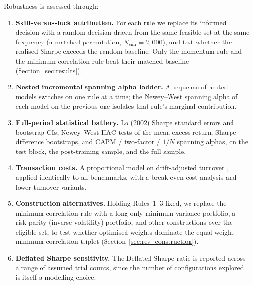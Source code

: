 Robustness is assessed through:
\begin{enumerate}[label=(\roman*)]
    \item \textbf{Skill-versus-luck attribution.} For each rule we replace its
          informed decision with a random decision drawn from the same feasible
          set at the same frequency (a matched permutation, $N_{\text{sim}} =
          2{,}000$), and test whether the realised Sharpe exceeds the random
          baseline. Only the momentum rule and the minimum-correlation rule beat
          their matched baseline (Section~\ref{sec:results}).
    \item \textbf{Nested incremental spanning-alpha ladder.} A sequence of nested
          models switches on one rule at a time; the Newey--West spanning alpha of
          each model on the previous one isolates that rule's marginal
          contribution.
    \item \textbf{Full-period statistical battery.} Lo (2002) Sharpe standard
          errors and bootstrap CIs, Newey--West HAC tests of the mean excess
          return, Sharpe-difference bootstraps, and CAPM / two-factor / $1/N$
          spanning alphas, on the test block, the post-training sample, and the
          full sample.
    \item \textbf{Transaction costs.} A proportional model on drift-adjusted
          turnover \citep{demiguel2009}, applied identically to all benchmarks,
          with a break-even cost analysis and lower-turnover variants.
    \item \textbf{Construction alternatives.} Holding Rules~1--3 fixed, we replace
          the minimum-correlation rule with a long-only minimum-variance portfolio,
          a risk-parity (inverse-volatility) portfolio, and other constructions over
          the eligible set, to test whether optimised weights dominate the
          equal-weight minimum-correlation triplet (Section~\ref{sec:res_construction}).
    \item \textbf{Deflated Sharpe sensitivity.} The \citet{bailey2014} Deflated
          Sharpe ratio is reported across a range of assumed trial counts, since the
          number of configurations explored is itself a modelling choice.
\end{enumerate}
